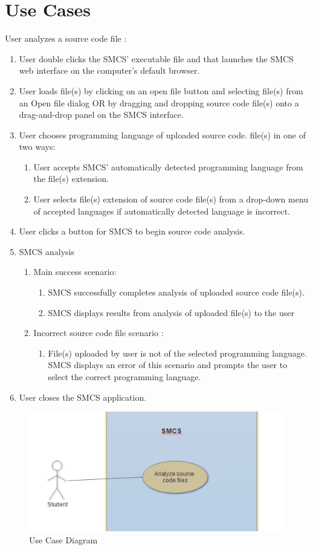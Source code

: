 \documentclass{scrreprt}
\begin{document}
	\section{Use Cases}
	User analyzes a source code file :
	\begin{enumerate}
		\item User double clicks the SMCS’ executable file and that launches the SMCS web interface on the computer’s default browser.
		\item User loads file(s) by clicking on an open file button and selecting file(s) from an Open file dialog OR by dragging and dropping source code file(s) onto a drag-and-drop panel on the SMCS interface.
		\item User chooses programming language of uploaded source code. file(s) in one of two ways:
		\begin{enumerate}
			\item User accepts SMCS’ automatically detected programming language from the file(s) extension.
			\item User selects file(s) extension of source code file(s) from a drop-down menu of accepted languages if automatically detected language is incorrect.
		\end{enumerate}
		\item User clicks a button for SMCS to begin source code analysis.
		\item SMCS analysis
		\begin{enumerate}
			\item Main success scenario:
			\begin{enumerate}
				\item SMCS successfully completes analysis of uploaded source code file(s).
				\item SMCS displays results from analysis of uploaded file(s) to the user
			\end{enumerate}
			\item Incorrect source code file scenario :
			\begin{enumerate}
				\item File(s) uploaded by user is not of the selected programming language. SMCS displays an error of this scenario and prompts the user to select the correct programming language.
			\end{enumerate}
		\end{enumerate}
		\item User closes the SMCS application.
	\end{enumerate}
	\begin{figure}[h]
		\caption{Use Case Diagram}
		\centering
		\includegraphics{use-case-diagram.png}
	\end{figure}
\end{document}
